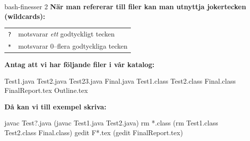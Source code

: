 \begin{Slide}{bash-finesser 2}
    \textbf{När man refererar till filer kan man utnyttja jokertecken (wildcards):}

    \blankline
        \begin{tabular}{ll}
            \texttt{?} & motsvarar \emph{ett} godtyckligt tecken \\
            \texttt{*} & motsvarar 0--flera godtyckliga tecken   \\
        \end{tabular}

    \blankline
    \textbf{Antag att vi har följande filer i vår katalog:}
\begin{Code}[language=]
Test1.java  Test2.java  Test23.java  Final.java
Test1.class Test2.class Final.class  FinalReport.tex
Outline.tex
\end{Code}

    \textbf{Då kan vi till exempel skriva:}
\begin{Code}[language=]
javac Test?.java (javac Test1.java Test2.java)
rm *.class       (rm Test1.class Test2.class Final.class)
gedit F*.tex     (gedit FinalReport.tex)
\end{Code}

\end{Slide}



